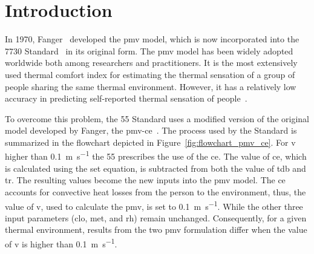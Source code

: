 \section{Introduction}\label{sec:introduction}

In 1970, Fanger~\cite{Fanger1970} developed the \ac{pmv} model, which is now incorporated into the \gls{7730} Standard~\cite{iso7730} in its original form.
The \ac{pmv} model has been widely adopted worldwide both among researchers and practitioners.
It is the most extensively used thermal comfort index for estimating the thermal sensation of a group of people sharing the same thermal environment.
However, it has a relatively low accuracy in predicting self-reported thermal sensation of people~\cite{Cheung2019}.

To overcome this problem, the \gls{55} Standard uses a modified version of the original model developed by Fanger, the \gls{pmv-ce}~\cite{ashrae552020}.
The process used by the Standard is summarized in the flowchart depicted in Figure~\ref{fig:flowchart_pmv_ce}.
For \ac{v} higher than \qty{0.1}{\m\per\s} the \gls{55} prescribes the use of the \ac{ce}.
The value of \ac{ce}, which is calculated using the \ac{set} equation, is subtracted from both the value of \ac{tdb} and \ac{tr}.
The resulting values become the new inputs into the \ac{pmv} model.
The \ac{ce} accounts for convective heat losses from the person to the environment, thus, the value of \ac{v}, used to calculate the \ac{pmv}, is set to \qty{0.1}{\m\per\s}.
While the other three input parameters (\ac{clo}, \ac{met}, and \ac{rh}) remain unchanged.
Consequently, for a given thermal environment, results from the two \ac{pmv} formulation differ when the value of \ac{v} is higher than \qty{0.1}{\m\per\s}.


